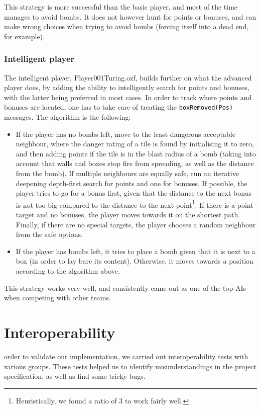 \documentclass[12pt,journal]{IEEEtran}
\newcommand{\ntt}{\normalfont\ttfamily}
\newcommand{\fn}[1]{{\protect\ntt#1}}
\begin{document}
This strategy is more successful than the basic player, and most of the time manages to avoid bombs.
It does not however hunt for points or bonuses, and can make wrong choices when trying to avoid bombs (forcing itself into a dead end, for example).

\subsubsection{Intelligent player}
The intelligent player, \fn{Player001Turing.ozf}, builds further on what the advanced player does, by adding the ability to intelligently search for points and bonuses, with the latter being preferred in most cases.
In order to track where points and bonuses are located, one has to take care of treating the \lstinline|boxRemoved(Pos)| messages.
The algorithm is the following:
\begin{itemize}
	\item If the player has no bombs left, move to the least dangerous acceptable neighbour, where the danger rating of a tile is found by initialising it to zero, and then adding points if the tile is in the blast radius of a bomb (taking into account that walls and boxes stop fire from spreading, as well as the distance from the bomb).
	If multiple neighbours are equally safe, run an iterative deepening depth-first search for points and one for bonuses.
	If possible, the player tries to go for a bonus first, given that the distance to the next bonus is not too big compared to the distance to the next point\footnote{Heuristically, we found a ratio of \(3\) to work fairly well.}.
	If there is a point target and no bonuses, the player moves towards it on the shortest path.
	Finally, if there are no special targets, the player chooses a random neighbour from the safe options.
	\item If the player has bombs left, it tries to place a bomb given that it is next to a box (in order to lay bare its content).
	Otherwise, it moves towards a position according to the algorithm above.
\end{itemize}

This strategy works very well, and consistently came out as one of the top AIs when competing with other teams.

\section{Interoperability}
 order to validate our implementation, we carried out interoperability tests with various groups.
These tests helped us to identify misunderstandings in the project specification, as well as find some tricky bugs.
\end{document}
